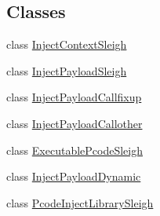 \subsection*{Classes}
\begin{DoxyCompactItemize}
\item 
class \mbox{\hyperlink{class_inject_context_sleigh}{Inject\+Context\+Sleigh}}
\item 
class \mbox{\hyperlink{class_inject_payload_sleigh}{Inject\+Payload\+Sleigh}}
\item 
class \mbox{\hyperlink{class_inject_payload_callfixup}{Inject\+Payload\+Callfixup}}
\item 
class \mbox{\hyperlink{class_inject_payload_callother}{Inject\+Payload\+Callother}}
\item 
class \mbox{\hyperlink{class_executable_pcode_sleigh}{Executable\+Pcode\+Sleigh}}
\item 
class \mbox{\hyperlink{class_inject_payload_dynamic}{Inject\+Payload\+Dynamic}}
\item 
class \mbox{\hyperlink{class_pcode_inject_library_sleigh}{Pcode\+Inject\+Library\+Sleigh}}
\end{DoxyCompactItemize}
